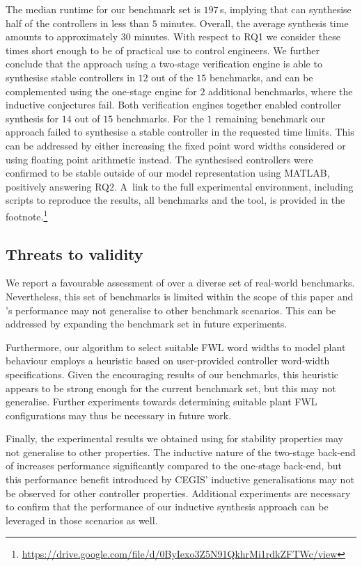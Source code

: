 \documentclass{sig-alternate-05-2015}
\begin{document}
The median runtime for our benchmark set is $197$\,s, implying that \tool
can synthesise half of the controllers in less than $5$ minutes.  Overall,
the average synthesis time amounts to approximately $30$ minutes.  With
respect to RQ1 we consider these times short enough to be of practical use
to control engineers.  We further conclude that the approach
using a two-stage verification engine is able to synthesise stable
controllers in $12$ out of the $15$ benchmarks, and can be complemented
using the one-stage engine for $2$ additional benchmarks, where the
inductive conjectures fail.  Both verification engines together enabled
controller synthesis for $14$ out of $15$ benchmarks.  For the $1$ remaining
benchmark our approach failed to synthesise a stable controller in the
requested time limits.  This can be addressed by either increasing the fixed
point word widths considered or using floating point arithmetic instead. 
The synthesised controllers were confirmed to be stable outside of our
model representation using MATLAB, positively answering RQ2.
A~link to the full experimental environment, including scripts to reproduce
the results, all benchmarks and the \tool tool, is provided in the
footnote.\footnote{\url{https://drive.google.com/file/d/0ByIexo3Z5N91QkhrMi1rdkZFTWc/view}}

\subsection{Threats to validity}

We report a favourable assessment of \tool over a diverse set of real-world
benchmarks. Nevertheless, this set of benchmarks is limited within the
scope of this paper and \tool's performance may not generalise to other
benchmark scenarios. This can be addressed by expanding the benchmark set
in future experiments.

Furthermore, our algorithm to select suitable FWL word widths to model
plant behaviour employs a heuristic based on user-provided controller
word-width specifications.  Given the encouraging results of our benchmarks,
this heuristic appears to be strong enough for the current benchmark set,
but this may not generalise.  Further experiments towards determining
suitable plant FWL configurations may thus be necessary in future work.

Finally, the experimental results we obtained using \tool for stability
properties may not generalise to other properties.  The inductive nature of
the two-stage back-end of \tool increases performance significantly compared
to the one-stage back-end, but this performance benefit introduced by CEGIS'
inductive generalisations may not be observed for other controller
properties.  Additional experiments are necessary to confirm that the
performance of our inductive synthesis approach can be leveraged in those
scenarios as well.
\end{document}
